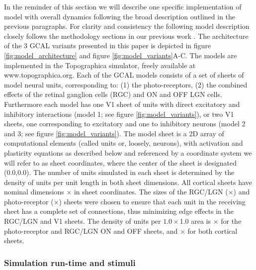 \documentclass[utf8]{frontiersSCNS}
\begin{document}
In the reminder of this section we will describe one specific implementation of model with overall dynamics following the 
broad description outlined in the previous paragraphs. For clarity and consistency the following model description closely follows the methodology sections in our 
previous work \citep{Stevens2013,Antolik2011}. The architecture of the 3 GCAL variants presented in this 
paper is depicted in figure \ref{fig:model_architecture} and figure \ref{fig:model_variants}A-C. The models are implemented in the Topographica simulator, freely available at www.topographica.org. 
Each of the GCAL models consists of a set of sheets of model neural units, corresponding to: (1) the photo-receptors, (2) the combined effects of the retinal ganglion cells (RGC) and ON and OFF LGN cells. Furthermore each model has one V1 sheet of units with direct excitatory and inhibitory interactions (model 1; see figure \ref{fig:model_variants}), or two 
V1 sheets, one corresponding to excitatory and one to inhibitory neurons (model 2 and 3; see figure \ref{fig:model_variants}).
The model sheet is a 2D array of computational elements (called units or, loosely, neurons), with activation and plasticity equations as 
described below and referenced by a coordinate system we will refer to as sheet coordinates, where the center of the sheet is designated (0.0,0.0).  
The number of units simulated in each sheet is determined by the density of units per unit length in both sheet dimensions. 
All cortical sheets have nominal dimensions $\times$ in sheet coordinates. The sizes of the
RGC/LGN ($\times$) and photo-receptor ($\times$) sheets
were chosen to ensure that each unit in the receiving sheet has a complete set of connections, thus minimizing edge effects in the
RGC/LGN and V1 sheets. The density of units per $1.0\times$1.0 area is $\times$ 
for the photo-receptor and RGC/LGN ON and OFF sheets, and $\times$ for both cortical sheets.

\subsubsection{Simulation run-time and stimuli}
\end{document}
